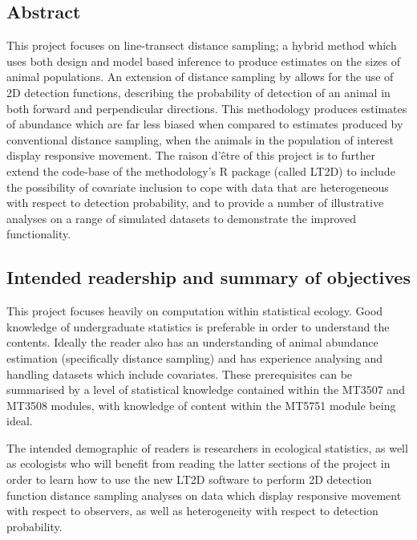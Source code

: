 \documentclass[11pt]{article}
\begin{document}
\tableofcontents
{}
\newpage
\begin{multicols}{2}

\newpage

\section{Abstract}
This project focuses on line-transect distance sampling; a hybrid method which uses both design and model based inference to produce estimates on the sizes of animal populations. An extension of distance sampling by \cite{Borchers} allows for the use of 2D detection functions, describing the probability of detection of an animal in both forward and perpendicular directions. This methodology produces estimates of abundance which are far less biased when compared to estimates produced by conventional distance sampling, when the animals in the population of interest display responsive movement. The raison d'être of this project is to further extend the code-base of the \cite{Borchers} methodology's R package (called LT2D) to include the possibility of covariate inclusion to cope with data that are heterogeneous with respect to detection probability, and to provide a number of illustrative analyses on a range of simulated datasets to demonstrate the improved functionality.

\subsection{Intended readership and summary of objectives}
This project focuses heavily on computation within statistical ecology. Good knowledge of undergraduate statistics is preferable in order to understand the contents. Ideally the reader also has an understanding of animal abundance estimation (specifically distance sampling) and has experience analysing and handling datasets which include covariates. These prerequisites can be summarised by a level of statistical knowledge contained within the MT3507 and MT3508 modules, with knowledge of content within the MT5751 module being ideal.

The intended demographic of readers is researchers in ecological statistics, as well as ecologists who will benefit from reading the latter sections of the project in order to learn how to use the new LT2D software to perform 2D detection function distance sampling analyses on data which display responsive movement with respect to observers, as well as heterogeneity with respect to detection probability. 


\end{multicols}
\end{document}

